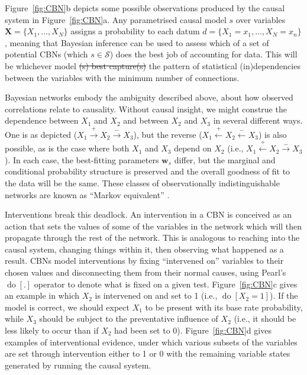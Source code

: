 \documentclass{cambridge7A}%
\DeclareMathOperator*{\Do}{do}
\newcommand{\ww}{\mathbf{w}} %
\newcommand{\dm}{d} %
\providecommand{\DIFadd}[1]{{\protect\color{blue}\uwave{#1}}} %
\providecommand{\DIFdel}[1]{{\protect\color{red}\sout{#1}}}                      %
\providecommand{\DIFaddbegin}{} %
\providecommand{\DIFaddend}{} %
\providecommand{\DIFdelbegin}{} %
\providecommand{\DIFdelend}{} %
\newcommand{\DIFscaledelfig}{0.5}
\newlength{\DIFdelgraphicswidth} %
\newlength{\DIFdelgraphicsheight} %
\newcommand{\DIFaddincludegraphics}[2][]{{\color{blue}\fbox{\DIFOincludegraphics[#1]{#2}}}} %
\newcommand{\DIFdelincludegraphics}[2][]{%
\sbox{\DIFdelgraphicsbox}{\DIFOincludegraphics[#1]{#2}}%
\settoboxwidth{\DIFdelgraphicswidth}{\DIFdelgraphicsbox} %
\settoboxtotalheight{\DIFdelgraphicsheight}{\DIFdelgraphicsbox} %
\scalebox{\DIFscaledelfig}{%
\parbox[b]{\DIFdelgraphicswidth}{\usebox{\DIFdelgraphicsbox}\\[-\baselineskip] \rule{\DIFdelgraphicswidth}{0em}}\llap{\resizebox{\DIFdelgraphicswidth}{\DIFdelgraphicsheight}{%
\setlength{\unitlength}{\DIFdelgraphicswidth}%
\begin{picture}(1,1)%
\thicklines\linethickness{2pt} %
{\color[rgb]{1,0,0}\put(0,0){\framebox(1,1){}}}%
{\color[rgb]{1,0,0}\put(0,0){\line( 1,1){1}}}%
{\color[rgb]{1,0,0}\put(0,1){\line(1,-1){1}}}%
\end{picture}%
}\hspace*{3pt}}} %
} %
\DeclareRobustCommand{\DIFaddbegin}{\DIFOaddbegin \let\includegraphics\DIFaddincludegraphics} %
\DeclareRobustCommand{\DIFaddend}{\DIFOaddend \let\includegraphics\DIFOincludegraphics} %
\DeclareRobustCommand{\DIFdelbegin}{\DIFOdelbegin \let\includegraphics\DIFdelincludegraphics} %
\DeclareRobustCommand{\DIFdelend}{\DIFOaddend \let\includegraphics\DIFOincludegraphics} %
\begin{document}
Figure~\ref{fig:CBN}b depicts some possible observations 
produced by the causal system in Figure~\ref{fig:CBN}a. 
Any parametrised causal model $s$ over variables $\mathbf{X} =\{X_1, \ldots, X_N\}$ assigns a probability to each datum ${\dm}=\{X_1=x_1, \ldots, X_N=x_n\}$, meaning that Bayesian inference can be used to assess which of a set of potential CBNs (which $s\in\mathcal{S}$) does the best job of accounting for data.  This will be whichever model \DIFdelbegin \DIFdel{(s) best capture(s) }\DIFdelend \DIFaddbegin \DIFadd{best captures }\DIFaddend the pattern of statistical (in)dependencies between the variables with the minimum number of connections.

Bayesian networks embody the ambiguity described above, about how observed correlations relate to causality.  Without causal insight, we might construe the dependence between $X_1$ and $X_2$ and between $X_2$ and $X_3$ in several different ways.  One is as depicted ($X_1\!\stackrel{+}\rightarrow\!X_2\!\stackrel{-}\rightarrow\!X_3$), but the reverse ($X_1\!\stackrel{+}\leftarrow\!X_2\!\stackrel{-}\leftarrow\!X_3$) is also possible, as is the case where both $X_1$ and $X_3$ depend on $X_2$ (i.e., $X_1\!\stackrel{+}\leftarrow\!X_2\!\stackrel{-}\rightarrow\!X_3$).  In each case, the best-fitting parameters $\ww_s$ differ, but the marginal and conditional probability structure is preserved and the overall goodness of fit to the data will be the same.  These classes of observationally indistinguishable networks are known as ``Markov equivalent'' \citep{pearl2000causality}.

Interventions break this deadlock.  An intervention in a CBN is conceived as an action that sets the values of some of the variables in the network which will then propagate through the rest of the network.   This is analogous to reaching into the causal system, changing things within it, then observing what happened as a result. CBNs model interventions by fixing ``intervened on'' variables to their chosen values and disconnecting them from their normal causes, using Pearl's $\Do[.]$ operator \citep{pearl2000causality} to denote what is fixed on a given test.  Figure~\ref{fig:CBN}c gives an example in which $X_2$ is intervened on and set to 1 (i.e., $\Do[X_2=1]$).  If the model is correct, we should expect $X_1$ to be present with its base rate probability, while $X_3$ should be subject to the preventative influence of $X_2$ (i.e., it should be less likely to occur than if $X_2$ had been set to 0).  Figure~\ref{fig:CBN}d gives examples of interventional evidence, under which various subsets of the variables are set through intervention either to 1 or 0 with the remaining variable states generated by running the causal system.
\end{document}
